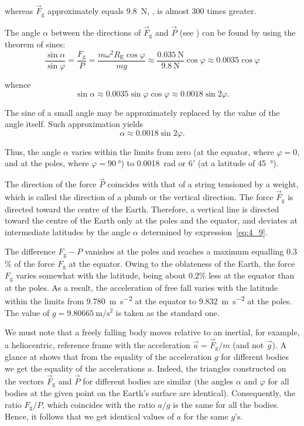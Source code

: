 \noindent
whereas $\vec{F}_{\text{g}}$ approximately equals \SI{9.8}{\newton}, \ie, is almost $300$ times greater.

The angle $\alpha$ between the directions of $\vec{F}_{\text{g}}$ and $\vec{P}$ (see ) can be found by using the theorem of sines:
\begin{equation*}
\frac{\sin\alpha}{\sin\varphi} = \frac{F_{\text{g}}}{P} = \frac{m\omega^2 R_{\text{E}}\cos\varphi}{mg} \approx \frac{\SI{0.035}{\newton}}{\SI{9.8}{\newton}} \cos\varphi \approx 0.0035 \cos\varphi 
\end{equation*}

\noindent
whence
\begin{equation*}
\sin\alpha \approx 0.0035\sin\varphi\cos\varphi \approx 0.0018 \sin 2\varphi.
\end{equation*}

\noindent
The sine of a small angle may be approximately replaced by the value of the angle itself. Such approximation yields
\begin{equation}\label{eq:4_9}
\alpha \approx 0.0018 \sin 2\varphi.
\end{equation}

\noindent
Thus, the angle $\alpha$ varies within the limits from zero (at the equator, where $\varphi=0$, and at the poles, where $\varphi=\SI{90}{\degree}$) to \SI{0.0018}{\radian} or $6'$ (at a latitude of \SI{45}{\degree}).

The direction of the force $\vec{P}$ coincides with that of a string tensioned by a weight, which is called the direction of a plumb or the vertical direction. The force $\vec{F}_{\text{g}}$ is directed toward the centre of the Earth. Therefore, a vertical line is directed toward the centre of the Earth only at the poles and the equator, and deviates at intermediate latitudes by the angle $\alpha$ determined by expression~\eqref{eq:4_9}.

The difference $F_{\text{g}}-P$ vanishes at the poles and reaches a maximum equalling $0.3$\% of the force $F_{\text{g}}$ at the equator. Owing to the oblateness of the Earth, the force $F_{\text{g}}$ varies somewhat with the latitude, being about $0.2$\% less at the equator than at the poles. As a result, the acceleration of free fall varies with the latitude within the limits from \SI{9.780}{\metre\per\square\second} at the equator to \SI{9.832}{\metre\per\square\second} at the poles. The value of $g=\SI{9.80665}{\metre\per\square\second}$ is taken as the standard one.

We must note that a freely falling body moves relative to an inertial, for example, a heliocentric, reference frame with the acceleration $\vec{a}=\vec{F}_{\text{g}}/m$ (and not $\vec{g}$). A glance at  shows that from the equality of the acceleration $g$ for different bodies we get the equality of the accelerations $a$. Indeed, the triangles constructed on the vectors $\vec{F}_{\text{g}}$ and $\vec{P}$ for different bodies are similar (the angles $\alpha$ and $\varphi$ for all bodies at the given point on the Earth's surface are identical). Consequently, the ratio $F_{\text{g}}/P$, which coincides with the ratio $a/g$ is the same for all the bodies. Hence, it follows that we get identical values of $a$ for the same $g$'s.

